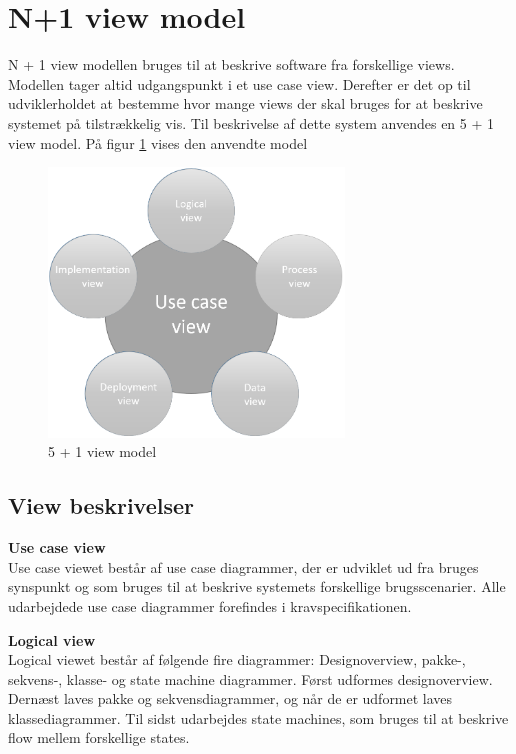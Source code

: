 \section{N+1 view model}

N + 1 view modellen bruges til at beskrive software fra forskellige views. Modellen tager altid udgangspunkt i et use case view. Derefter er det op til udviklerholdet at bestemme hvor mange views der skal bruges for at beskrive systemet på tilstrækkelig vis. Til beskrivelse af dette system anvendes en 5 + 1 view model. På figur \ref{fig:5 + 1 view model} vises den anvendte model


\vspace{-5pt}
\begin{figure}[H]
	\centering
	\includegraphics[width=0.7\textwidth]{Billeder/n+1}
	\vspace{0cm}
	\caption{5 + 1 view model}
	\label{fig:5 + 1 view model}
\end{figure}


\newpage

\subsection{View beskrivelser}

\textbf{Use case view}\\
Use case viewet består af use case diagrammer, der er udviklet ud fra bruges synspunkt og som bruges til at beskrive systemets forskellige brugsscenarier. Alle udarbejdede use case diagrammer forefindes i kravspecifikationen.

\textbf{Logical view}\\
Logical viewet består af følgende fire diagrammer: Designoverview, pakke-, sekvens-, klasse- og state machine diagrammer.
Først udformes designoverview. Dernæst laves pakke og sekvensdiagrammer, og når de er udformet laves klassediagrammer. Til sidst udarbejdes state machines, som bruges til at beskrive flow mellem forskellige states.

